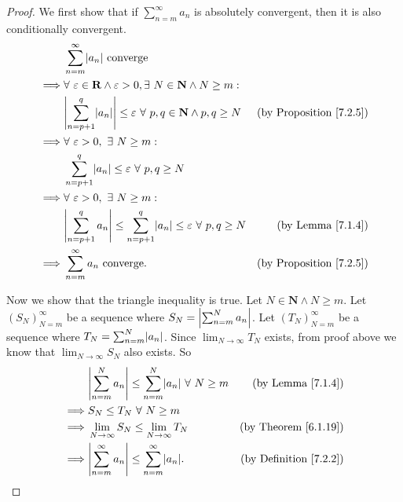 \begin{proof}
We first show that if \(\sum_{n = m}^\infty a_n\) is absolutely convergent, then it is also conditionally convergent.
\begin{align*}
& \sum_{n = m}^\infty \abs*{a_n} \text{ converge} \\
\implies & \forall\ \varepsilon \in \mathbf{R} \land \varepsilon > 0, \exists\ N \in \mathbf{N} \land N \geq m : \\
& \abs*{\sum_{n = p + 1}^q \abs*{a_n}} \leq \varepsilon\ \forall\ p, q \in \mathbf{N} \land p, q \geq N & \text{(by Proposition \ref{7.2.5})} \\
\implies & \forall\ \varepsilon > 0, \ \exists\ N \geq m : \\
& \sum_{n = p + 1}^q \abs*{a_n} \leq \varepsilon\ \forall\ p, q \geq N \\
\implies & \forall\ \varepsilon > 0, \ \exists\ N \geq m : \\
& \abs*{\sum_{n = p + 1}^q a_n} \leq \sum_{n = p + 1}^q \abs*{a_n} \leq \varepsilon\ \forall\ p, q \geq N & \text{(by Lemma \ref{7.1.4})} \\
\implies & \sum_{n = m}^\infty a_n \text{ converge}. & \text{(by Proposition \ref{7.2.5})}
\end{align*}

Now we show that the triangle inequality is true.
Let \(N \in \mathbf{N} \land N \geq m\).
Let \((S_N)_{N = m}^\infty\) be a sequence where \(S_N = \abs*{\sum_{n = m}^N a_n}\).
Let \((T_N)_{N = m}^\infty\) be a sequence where \(T_N = \sum_{n = m}^N \abs*{a_n}\).
Since \(\lim_{N \to \infty} T_N\) exists, from proof above we know that \(\lim_{N \to \infty} S_N\) also exists.
So
\begin{align*}
& \abs*{\sum_{n = m}^N a_n} \leq \sum_{n = m}^N \abs*{a_n} \ \forall\ N \geq m & \text{(by Lemma \ref{7.1.4})} \\
\implies & S_N \leq T_N \ \forall\ N \geq m \\
\implies & \lim_{N \to \infty} S_N \leq \lim_{N \to \infty} T_N & \text{(by Theorem \ref{6.1.19})} \\
\implies & \abs*{\sum_{n = m}^\infty a_n} \leq \sum_{n = m}^\infty \abs*{a_n}. & \text{(by Definition \ref{7.2.2})}
\end{align*}
\end{proof}